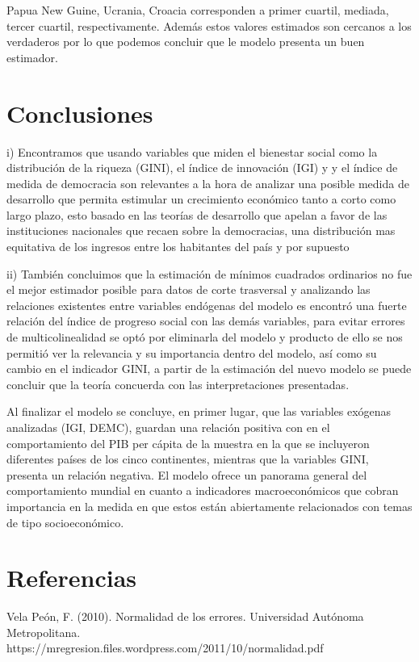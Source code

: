 \documentclass[11pt]{article}
\begin{document}
{Papua New Guine, Ucrania, Croacia corresponden a primer cuartil, mediada, tercer cuartil, respectivamente. Además estos valores estimados son cercanos a los verdaderos por lo que podemos concluir que le modelo presenta un buen estimador.

 \section{Conclusiones} 

 i) Encontramos que usando variables que miden el bienestar social como la distribución de la riqueza (GINI), el índice de innovación (IGI) y y el índice de medida de democracia son relevantes a la hora de analizar una posible medida de desarrollo que permita estimular un crecimiento económico tanto a corto como largo plazo, esto basado en las teorías de desarrollo que apelan a favor de las instituciones nacionales que recaen sobre la democracias, una distribución mas equitativa de los ingresos entre los habitantes del país y por supuesto 
 
 ii) También concluimos que la estimación de mínimos cuadrados ordinarios no fue el mejor estimador posible para datos de corte trasversal y analizando las relaciones existentes entre variables endógenas del modelo es encontró una fuerte relación del índice de progreso social con las demás variables, para evitar errores de multicolinealidad se optó por eliminarla del modelo y producto de ello se nos permitió ver la relevancia y su importancia dentro del modelo, así como su cambio en el indicador GINI, a partir de la estimación del nuevo modelo se puede concluir que la teoría concuerda con las interpretaciones presentadas. 

 Al finalizar el modelo se concluye, en primer lugar, que las variables exógenas analizadas (IGI, DEMC), guardan una relación positiva con en el comportamiento del PIB per cápita de la muestra en la que se incluyeron diferentes países de los cinco continentes, mientras que la variables GINI, presenta un relación negativa. El modelo ofrece un panorama general del comportamiento mundial en cuanto a indicadores macroeconómicos que cobran importancia en la medida en que estos están abiertamente relacionados con temas de tipo socioeconómico.

 \section{Referencias}
 
Vela Peón, F. (2010). Normalidad de los errores. Universidad Autónoma Metropolitana.\\ https://mregresion.files.wordpress.com/2011/10/normalidad.pdf

}
\end{document}
